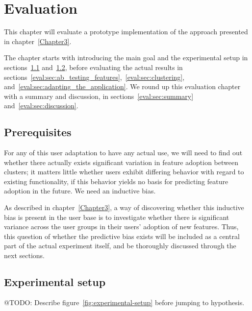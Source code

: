 \chapter{Evaluation}

\label{Chapter4}


This chapter will evaluate a prototype implementation of the approach presented in chapter~\ref{Chapter3}.

The chapter starts with introducing the main goal and the experimental setup in sections~\ref{eval:sec:prerequisites} and~\ref{eval:sec:experimental_setup},
before evaluating the actual results in sections~\ref{eval:sec:ab_testing_features},~\ref{eval:sec:clustering}, and~\ref{eval:sec:adapting_the_application}.
We round up this evaluation chapter with a summary and discussion, in sections~\ref{eval:sec:summary} and~\ref{eval:sec:discussion}.

\section{Prerequisites} %
\label{eval:sec:prerequisites}

For any of this user adaptation to have any actual use, we will need to find out whether there actually exists significant variation in feature adoption between clusters; it matters little whether users exhibit differing behavior with regard to existing functionality, if this behavior yields no basis for predicting feature adoption in the future. We need an inductive bias.

As described in chapter~\ref{Chapter3}, a way of discovering whether this inductive bias is present in the user base is to investigate whether there is significant variance across the user groups in their users' adoption of new features. Thus, this question of whether the predictive bias exists will be included as a central part of the actual experiment itself, and be thoroughly discussed through the next sections.


\section{Experimental setup} %
\label{eval:sec:experimental_setup}

@TODO: Describe figure~\ref{fig:experimental-setup} before jumping to hypothesis.

